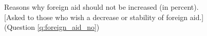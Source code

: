\documentclass[12pt,english]{article}
\begin{document}
\begin{figure}[h!]
\caption[Reasons why foreign aid should not be increased]{Reasons why foreign aid should not be increased (in percent). [Asked to those who wish a decrease or stability of foreign aid.] (Question \ref{q:foreign_aid_no})}\label{fig:foreign_aid_no}
\end{figure}
\end{document}
